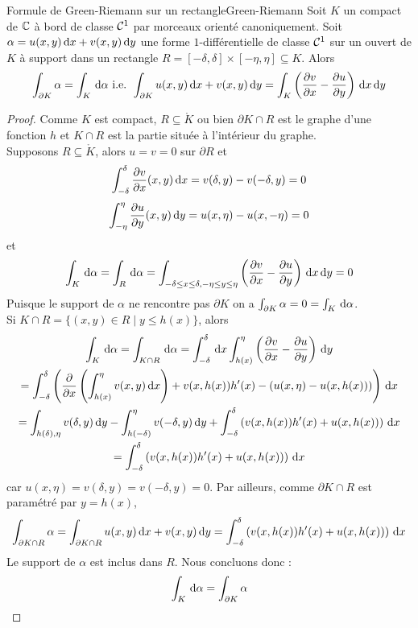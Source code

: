 \documentclass{cours}
\begin{document}
\begin{lemme}{Formule de Green-Riemann sur un rectangle}{Green-Riemann}
    Soit $K$ un compact de $\mathbb{C}$ à bord de classe $\mathcal{C}^{1}$ par morceaux orienté canoniquement. Soit $\alpha = u(x, y){\rm \, d} x + v(x, y){\rm \, d} y$ une forme $1$-différentielle de classe $\mathcal{C}^{1}$ sur un ouvert de $K$ à support dans un rectangle $R = [- \delta, \delta] \times [-\eta, \eta] \subseteq K$. Alors 
    \[
        \int_{\partial K} \alpha = \int_{K}{\rm \, d} \alpha \text{ i.e. } \int_{\partial K}u(x, y){\rm \, d} x + v(x, y) {\rm \, d} y = \int_{K}\left(\frac{\partial v}{\partial x} - \frac{\partial u}{\partial y}\right){\rm \, d} x{\rm \, d} y
    \]
\end{lemme}
\begin{proof}
    Comme $K$ est compact, $R\subseteq \mathring{K}$ ou bien $\partial{K \cap R}$ est le graphe d'une fonction $h$ et $K \cap R$ est la partie située à l'intérieur du graphe.\\
    Supposons $R \subseteq \mathring{K}$, alors $u = v = 0$ sur $\partial R$ et 
    \[
        \int_{-\delta}^{\delta}\frac{\partial v}{\partial x}(x, y){\rm \, d} x = v(\delta, y) - v(-\delta, y) = 0
    \]
    \[
        \int_{-\eta}^{\eta}\frac{\partial u}{\partial y}(x, y){\rm \, d} y = u(x, \eta) - u(x, -\eta) = 0  
    \]
    et 
    \[
        \int_{K}{\rm \, d} \alpha = \int_{R}{\rm \, d} \alpha = \int_{-\delta \leq x \leq \delta, -\eta \leq y \leq \eta} \left(\frac{\partial v}{\partial x} - \frac{\partial u}{\partial y}\right){\rm \, d} x{\rm \, d} y = 0
    \]
    Puisque le support de $\alpha$ ne rencontre pas $\partial K$ on a $\int_{\partial K} \alpha = 0 = \int_{K}{\rm \, d} \alpha$. \\
    Si $K \cap R = \{(x, y) \in R \mid y \leq h(x)\}$, alors 
    \begin{gather*}
        \int_{K}{\rm \, d} \alpha = \int_{K \cap R}{\rm \, d} \alpha = \int_{- \delta}^{\delta}{\rm \, d} x \int_{h(x)}^{\eta}\left(\frac{\partial v}{\partial x} - \frac{\partial u}{\partial y}\right){\rm \, d} y\\
        = \int_{- \delta}^{\delta}\left(\frac{\partial}{\partial x}\left(\int_{h(x)}^{\eta}v(x, y){\rm \, d} x\right)+ v(x, h(x))h'(x) - \left(u(x, \eta) - u(x, h(x))\right)\right) {\rm \, d} x\\
        = \int_{h(\delta), \eta}v(\delta, y){\rm \, d} y - \int_{h(-\delta)}^{\eta} v(-\delta, y){\rm \, d} y + \int_{-\delta}^{\delta} \left(v(x, h(x))h'(x) + u(x, h(x))\right){\rm \, d} x\\
        = \int_{-\delta}^{\delta} \left(v(x, h(x))h'(x) + u(x, h(x))\right){\rm \, d} x
    \end{gather*}
    car $u(x, \eta) = v(\delta, y) = v(-\delta, y) = 0$. Par ailleurs, comme $\partial K \cap R$ est paramétré par $y = h(x)$,
    \[
        \int_{\partial{K}\cap R}\alpha = \int_{\partial K \cap R} u(x, y){\rm \, d} x + v(x, y){\rm \, d} y = \int_{- \delta}^{\delta} \left(v(x, h(x))h'(x) + u(x, h(x))\right){\rm \, d} x
    \]
    Le support de $\alpha$ est inclus dans $R$. Nous concluons donc :
    \[
        \int_{K}{\rm \, d} \alpha = \int_{\partial K} \alpha 
    \]
\end{proof}
\end{document}
